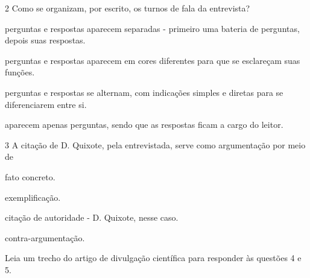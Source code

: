\num{2} Como se organizam, por escrito, os turnos de fala da entrevista?

\begin{escolha}
\item perguntas e respostas aparecem separadas - primeiro uma bateria de
perguntas, depois suas respostas.

\item perguntas e respostas aparecem em cores diferentes para que se
esclareçam suas funções.

\item perguntas e respostas se alternam, com indicações simples e diretas
para se diferenciarem entre si.

\item aparecem apenas perguntas, sendo que as respostas ficam a cargo do
leitor.
\end{escolha}

\num{3} A citação de D. Quixote, pela entrevistada, serve como
argumentação por meio de


\begin{escolha}
\item fato concreto.

\item exemplificação.

\item citação de autoridade - D. Quixote, nesse caso.

\item contra-argumentação.

\end{escolha}

Leia um trecho do artigo de divulgação científica para responder às
questões 4 e 5.

